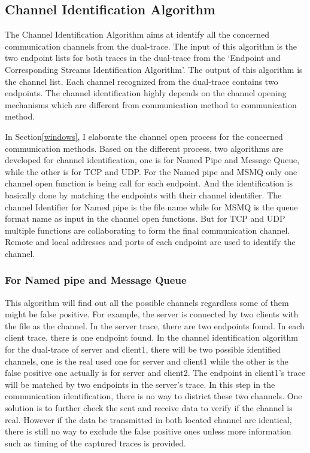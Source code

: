 \subsection{Channel Identification Algorithm}
The Channel Identification Algorithm aims at identify all the concerned communication channels from the dual-trace. The input of this algorithm is the two endpoint lists for both traces in the dual-trace from the `Endpoint and Corresponding Streams Identification Algorithm'. The output of this algorithm is the channel list. Each channel recognized from the dual-trace contains two endpoints. The channel identification highly depends on the channel opening mechanisms which are different from communication method to communication method. 

In Section\ref{windows}, I elaborate the channel open process for the concerned communication methods. Based on the different process, two algorithms are developed for channel identification, one is for Named Pipe and Message Queue, while the other is for TCP and UDP. For the Named pipe and MSMQ only one channel open function is being call for each endpoint. And the identification is basically done by matching the endpoints with their channel identifier. The channel Identifier for Named pipe is the file name while for MSMQ is the queue format name as input in the channel open functions. But for TCP and UDP multiple functions are collaborating to form the final communication channel. Remote and local addresses and ports of each endpoint are used to identify the channel. 

\subsubsection{For Named pipe and Message Queue}
This algorithm will find out all the possible channels regardless some of them might be false positive. For example, the server is connected by two clients with the file as the channel. In the server trace, there are two endpoints found. In each client trace, there is one endpoint found. In the channel identification algorithm for the dual-trace of server and client1, there will be two possible identified channels, one is the real used one for server and client1 while the other is the false positive one actually is for server and client2. The endpoint in client1's trace will be matched by two endpoints in the server's trace. In this step in the communication identification, there is no way to district these two channels. One solution is to further check the sent and receive data to verify if the channel is real. However if the data be transmitted in both located channel are identical, there is still no way to exclude the false positive ones unless more information such as timing of the captured traces is provided.

